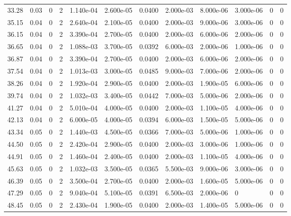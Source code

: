 \documentclass[preview]{standalone}
\begin{document}
{{{\begin{tabular}{L{1.2cm}C{1.2cm} C{0.3cm}C{0.5cm} C{1.4cm}C{1.4cm} C{1.4cm}C{1.4cm} C{1.6cm}C{1.6cm} C{1.6cm}C{1.6cm}}
  33.28  &  0.03  & 0     &  2 &  1.140e-04  & 2.600e-05  &  0.0400&   2.000e-03& 8.000e-06 & 3.000e-06   &  0 & 0  \\ 
  35.15  &  0.04  & 0     &  2 &  2.640e-04  & 2.100e-05  &  0.0400&   2.000e-03& 9.000e-06 & 3.000e-06   &  0 & 0  \\ 
  36.15  &  0.04  & 0     &  2 &  3.390e-04  & 2.700e-05  &  0.0400&   2.000e-03& 6.000e-06 & 2.000e-06   &  0 & 0  \\ 
  36.65  &  0.04  & 0     &  2 &  1.088e-03  & 3.700e-05  &  0.0392&   6.000e-03& 2.000e-06 & 1.000e-06   &  0 & 0  \\ 
  36.87  &  0.04  & 0     &  2 &  3.390e-04  & 2.700e-05  &  0.0400&   2.000e-03& 6.000e-06 & 2.000e-06   &  0 & 0  \\ 
  37.54  &  0.04  & 0     &  2 &  1.013e-03  & 3.000e-05  &  0.0485&   9.000e-03& 7.000e-06 & 2.000e-06   &  0 & 0  \\ 
  38.26  &  0.04  & 0     &  2 &  1.920e-04  & 2.900e-05  &  0.0400&   2.000e-03& 1.900e-05 & 6.000e-06   &  0 & 0  \\ 
  39.74  &  0.04  & 0     &  2 &  1.032e-03  & 3.400e-05  &  0.0442&   7.000e-03& 5.000e-06 & 2.000e-06   &  0 & 0  \\ 
  41.27  &  0.04  & 0     &  2 &  5.010e-04  & 4.000e-05  &  0.0400&   2.000e-03& 1.100e-05 & 4.000e-06   &  0 & 0  \\ 
  42.13  &  0.04  & 0     &  2 &  6.000e-05  & 4.000e-05  &  0.0394&   6.000e-03& 1.500e-05 & 5.000e-06   &  0 & 0  \\ 
  43.34  &  0.05  & 0     &  2 &  1.440e-03  & 4.500e-05  &  0.0366&   7.000e-03& 5.000e-06 & 1.000e-06   &  0 & 0  \\ 
  44.50  &  0.05  & 0     &  2 &  2.420e-04  & 2.900e-05  &  0.0400&   2.000e-03& 3.000e-06 & 1.000e-06   &  0 & 0  \\ 
  44.91  &  0.05  & 0     &  2 &  1.460e-04  & 2.400e-05  &  0.0400&   2.000e-03& 1.100e-05 & 4.000e-06   &  0 & 0  \\ 
  45.63  &  0.05  & 0     &  2 &  1.032e-03  & 3.500e-05  &  0.0365&   5.500e-03& 9.000e-06 & 3.000e-06   &  0 & 0  \\ 
  46.39  &  0.05  & 0     &  2 &  3.500e-04  & 2.700e-05  &  0.0400&   2.000e-03& 1.600e-05 & 5.000e-06   &  0 & 0  \\ 
  47.29  &  0.05  & 0     &  2 &  9.040e-04  & 5.100e-05  &  0.0391&   6.500e-03& 2.000e-06 & 0   &  0 & 0  \\ 
  48.45  &  0.05  & 0     &  2 &  2.430e-04  & 1.900e-05  &  0.0400&   2.000e-03& 1.400e-05 & 5.000e-06   &  0 & 0  \\ 

\end{tabular}}}}
\end{document}
